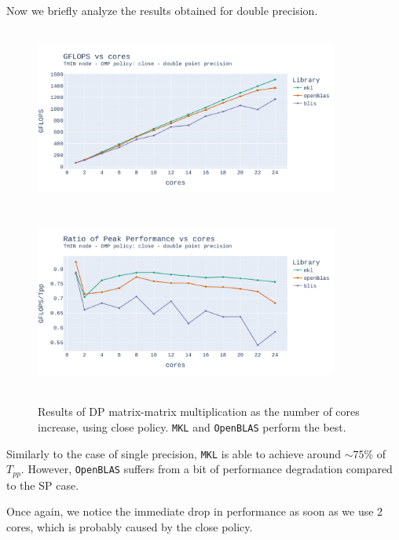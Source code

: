\documentclass{report}
\begin{document}
Now we briefly analyze the results obtained for double precision.
\begin{figure}[H]
\hspace*{-2.5cm}
\includegraphics[width=10cm, height=6cm]{./images/fixed_size_thin_double_gflops_close.pdf}
\includegraphics[width=10cm, height=6cm]{./images/fixed_size_thin_double_gflops_close_ratio.pdf}
\caption{\label{fig:fixed_size_thin_double_close} Results of DP matrix-matrix multiplication 
    as the number of cores increase, using close policy. \texttt{MKL} and \texttt{OpenBLAS}
perform the best.} 
\end{figure}

Similarly to the case of single precision, \texttt{MKL} is able to achieve around 
$\sim 75\%$ of $T_{pp}$. However, \texttt{OpenBLAS} suffers from a bit of performance 
degradation compared to the SP case. 

Once again, we notice the immediate drop in performance as soon as we use 2 cores, 
which is probably caused by the close policy. 
\end{document}
